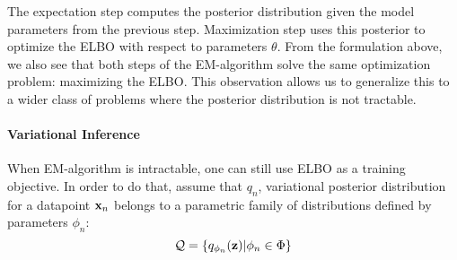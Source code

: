 The expectation step computes the posterior distribution given the model parameters from the previous step. Maximization step uses this posterior to optimize the ELBO with respect to parameters $\theta$. From the formulation above, we also see that both steps of the EM-algorithm solve the same optimization problem: maximizing the ELBO.  This observation allows us to generalize this to a wider class of problems where the posterior distribution is not tractable. 

\paragraph{Variational Inference}
When EM-algorithm is intractable, one can still use ELBO as a training objective. 
In order to do that, assume that $q_n$,  variational posterior distribution for a datapoint ${\mathbf{x}}_n$ belongs to a parametric family of distributions defined by parameters $\phi_n$:
\begin{equation}
    \mathcal{Q} = \{q_{\phi_n}({\mathbf{z}}) | \phi_n \in \Phi\}
\end{equation}

